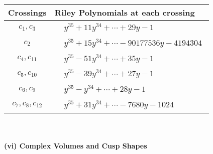 \documentclass[1p]{elsarticle_modified}
\theoremstyle{definition}
\begin{document}
\begin{tabular}{m{50pt}|m{274pt}}
Crossings & \hspace{64pt}Riley Polynomials at each crossing \\
\hline $$\begin{aligned}c_{1},c_{3}\end{aligned}$$&$\begin{aligned}
&y^{35}+11 y^{34}+\cdots+29 y-1
\end{aligned}$\\
\hline $$\begin{aligned}c_{2}\end{aligned}$$&$\begin{aligned}
&y^{35}+15 y^{34}+\cdots-90177536 y-4194304
\end{aligned}$\\
\hline $$\begin{aligned}c_{4},c_{11}\end{aligned}$$&$\begin{aligned}
&y^{35}-51 y^{34}+\cdots+35 y-1
\end{aligned}$\\
\hline $$\begin{aligned}c_{5},c_{10}\end{aligned}$$&$\begin{aligned}
&y^{35}-39 y^{34}+\cdots+27 y-1
\end{aligned}$\\
\hline $$\begin{aligned}c_{6},c_{9}\end{aligned}$$&$\begin{aligned}
&y^{35}- y^{34}+\cdots+28 y-1
\end{aligned}$\\
\hline $$\begin{aligned}c_{7},c_{8},c_{12}\end{aligned}$$&$\begin{aligned}
&y^{35}+31 y^{34}+\cdots-7680 y-1024
\end{aligned}$\\
\hline
\end{tabular}\\~\\
\newpage\flushleft \textbf{(vi) Complex Volumes and Cusp Shapes}
\end{document}
